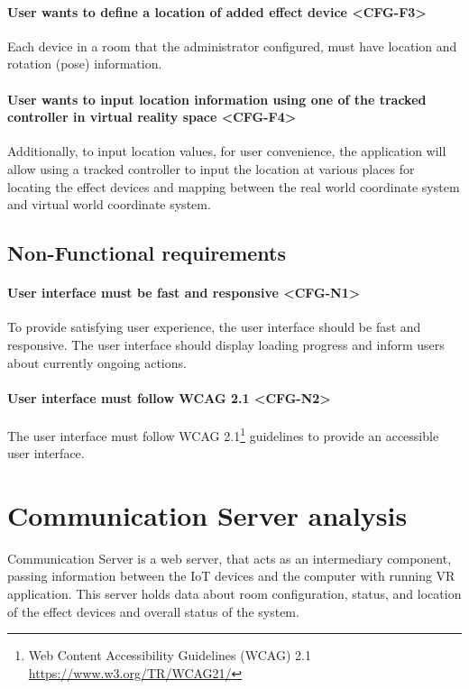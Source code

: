 \paragraph*{User wants to define a location of added effect device <CFG-F3>}
\label{cfg-f3}
Each device in a room that the administrator configured,
must have location and rotation (pose) information.


\paragraph*{User wants to input location information using one of the tracked controller in virtual reality space <CFG-F4>}
\label{cfg-f4}
Additionally, to input location values, for user convenience,
the application will allow using a tracked controller to input the location at
various places for locating the effect
devices and mapping between the real world coordinate system and virtual
world coordinate system.


\subsection{Non-Functional requirements}

\paragraph*{User interface must be fast and responsive <CFG-N1>}
\label{cfg-n1}
To provide satisfying user experience, the user interface should be fast and
responsive. The user interface should display loading progress and inform users
about currently ongoing actions.


\paragraph*{User interface must follow WCAG 2.1 <CFG-N2>}
\label{cfg-n2}
The user interface must follow WCAG 2.1\footnote{Web Content Accessibility 
Guidelines (WCAG) 2.1 \href{https://www.w3.org/TR/WCAG21/}{https://www.w3.org/TR/WCAG21/}}
guidelines to provide an accessible user interface.


\section{Communication Server analysis}\label{analysis:server}

Communication Server is a web server, that acts as an intermediary component,
passing information between the IoT devices and the computer with
running VR application. This server holds data about room configuration,
status, and location of the effect devices and overall status of the system.

